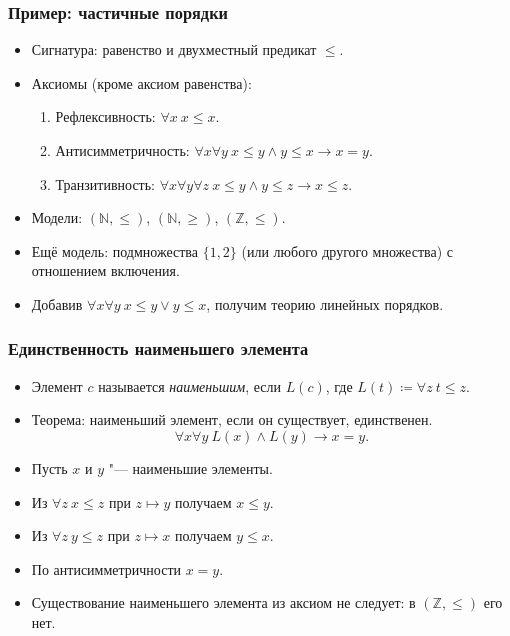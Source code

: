 \documentclass[10pt]{beamer}
\begin{document}
\begin{frame}
    \frametitle{Пример: частичные порядки}
    \begin{itemize}
        \item Сигнатура: равенство и двухместный предикат $\le$.
        \item Аксиомы (кроме аксиом равенства): \pause
        \begin{enumerate}
            \item Рефлексивность: $\forall x~x\le x$. \pause
            \item Антисимметричность:
            $\forall x\forall y~x\le y\land y\le x\to x=y$. \pause
            \item Транзитивность:
            $\forall x\forall y\forall z~x\le y\land y\le z\to x\le z$.
        \end{enumerate}
        \pause
        \item Модели: $(\mathbb{N},\le)$, $(\mathbb{N},\ge)$, $(\mathbb{Z},\le)$.
        \item Ещё модель: подмножества $\{1,2\}$ (или любого другого множества) с отношением включения.
        \item Добавив $\forall x\forall y~x\le y\lor y\le x$, получим теорию линейных порядков.
    \end{itemize}
\end{frame}

\begin{frame}
    \frametitle{Единственность наименьшего элемента}
    \begin{itemize}
        \item Элемент $c$ называется \emph{наименьшим}, если $L(c)$, где $L(t)\coloneqq\forall z~t\le z$.
        \item Теорема: наименьший элемент, если он существует, единственен.
        \[
            \forall x\forall y~L(x)\land L(y)\to x=y.
        \]
        \pause
        \item Пусть $x$ и $y$ "--- наименьшие элементы.
        \item Из $\forall z~x\le z$ при $z\mapsto y$ получаем $x\le y$. \pause
        \item Из $\forall z~y\le z$ при $z\mapsto x$ получаем $y\le x$. \pause
        \item По антисимметричности $x=y$. \pause
        \item Существование наименьшего элемента из аксиом не следует: в $(\mathbb{Z},\le)$ его нет.
    \end{itemize}
\end{frame}
\end{document}
